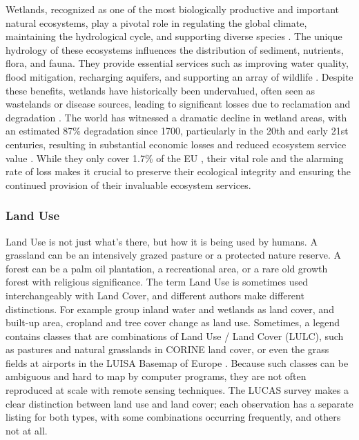         Wetlands, recognized as one of the most biologically productive and important natural ecosystems, play a pivotal role in regulating the global climate, maintaining the hydrological cycle, and supporting diverse species \citep{hu2017global,ramsar2001wetlands}. The unique hydrology of these ecosystems influences the distribution of sediment, nutrients, flora, and fauna. They provide essential services such as improving water quality, flood mitigation, recharging aquifers, and supporting an array of wildlife \citep{costanza1997value,smardon2009sustaining}. Despite these benefits, wetlands have historically been undervalued, often seen as wastelands or disease sources, leading to significant losses due to reclamation and degradation \citep{giblett1996postmodern,owens2001global,davidson2014much,gardner2018global,dugan1993wetlands,oecd1996guidelines,ramsar2015wetlands}. The world has witnessed a dramatic decline in wetland areas, with an estimated 87\% degradation since 1700, particularly in the 20th and early 21st centuries, resulting in substantial economic losses and reduced ecosystem service value \citep{gardner2015state,costanza2014changes}. While they only cover 1.7\% of the EU \citep{eurostat2021land}, their vital role and the alarming rate of loss makes it crucial to preserve their ecological integrity and ensuring the continued provision of their invaluable ecosystem services.

    \subsubsection{Land Use}

        Land Use is not just what's there, but how it is being used by humans. A grassland can be an intensively grazed pasture or a protected nature reserve. A forest can be a palm oil plantation, a recreational area, or a rare old growth forest with religious significance. The term Land Use is sometimes used interchangeably with Land Cover, and different authors make different distinctions. For example \citet{hansen2022global} group inland water and wetlands as land cover, and built-up area, cropland and tree cover change as land use. Sometimes, a legend contains classes that are combinations of Land Use / Land Cover (LULC), such as pastures and natural grasslands in CORINE land cover, or even the grass fields at airports in the LUISA Basemap of Europe \citep{pigaiani2021luisa}. Because such classes can be ambiguous and hard to map by computer programs, they are not often reproduced at scale with remote sensing techniques. The LUCAS survey makes a clear distinction between land use and land cover; each observation has a separate listing for both types, with some combinations occurring frequently, and others not at all.

